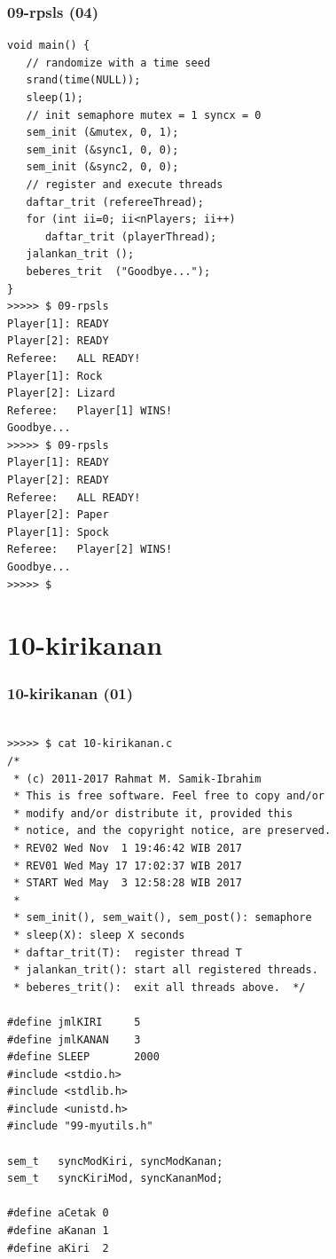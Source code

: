 \documentclass[xcolor=table, notheorems, hyperref={pdfpagelabels=false}]{beamer}
\begin{document}
\begin{frame}[fragile]
\frametitle{09-rpsls (04)}
\begin{lstlisting}[basicstyle=\ttfamily\tiny]
void main() {
   // randomize with a time seed
   srand(time(NULL));          
   sleep(1);
   // init semaphore mutex = 1 syncx = 0
   sem_init (&mutex, 0, 1);    
   sem_init (&sync1, 0, 0);
   sem_init (&sync2, 0, 0);
   // register and execute threads
   daftar_trit (refereeThread);
   for (int ii=0; ii<nPlayers; ii++)
      daftar_trit (playerThread);
   jalankan_trit ();
   beberes_trit  ("Goodbye...");
}
>>>>> $ 09-rpsls 
Player[1]: READY
Player[2]: READY
Referee:   ALL READY!
Player[1]: Rock
Player[2]: Lizard
Referee:   Player[1] WINS!
Goodbye...
>>>>> $ 09-rpsls 
Player[1]: READY
Player[2]: READY
Referee:   ALL READY!
Player[2]: Paper
Player[1]: Spock
Referee:   Player[2] WINS!
Goodbye...
>>>>> $

\end{lstlisting}
\end{frame}

\section{10-kirikanan}
\begin{frame}[fragile]
\frametitle{10-kirikanan (01)}
\begin{lstlisting}[basicstyle=\ttfamily\tiny]

>>>>> $ cat 10-kirikanan.c
/* 
 * (c) 2011-2017 Rahmat M. Samik-Ibrahim
 * This is free software. Feel free to copy and/or 
 * modify and/or distribute it, provided this 
 * notice, and the copyright notice, are preserved. 
 * REV02 Wed Nov  1 19:46:42 WIB 2017
 * REV01 Wed May 17 17:02:37 WIB 2017
 * START Wed May  3 12:58:28 WIB 2017
 *
 * sem_init(), sem_wait(), sem_post(): semaphore
 * sleep(X): sleep X seconds
 * daftar_trit(T):  register thread T
 * jalankan_trit(): start all registered threads.
 * beberes_trit():  exit all threads above.  */

#define jmlKIRI     5
#define jmlKANAN    3
#define SLEEP       2000
#include <stdio.h>
#include <stdlib.h>
#include <unistd.h>
#include "99-myutils.h"

sem_t   syncModKiri, syncModKanan;
sem_t   syncKiriMod, syncKananMod;

#define aCetak 0
#define aKanan 1
#define aKiri  2

\end{lstlisting}
\end{frame}
\end{document}

